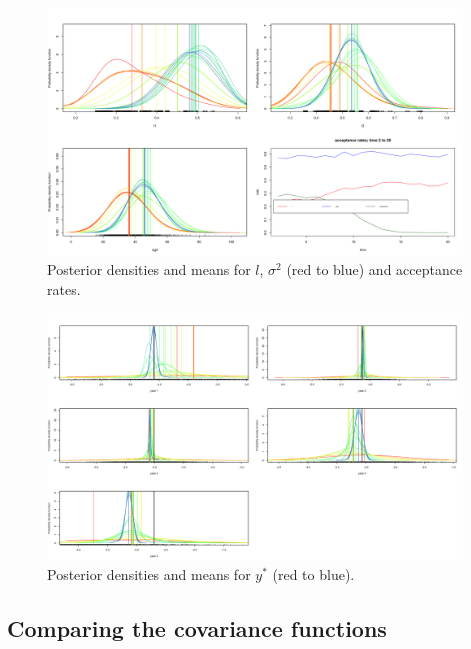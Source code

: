 \documentclass{sfuthesis}
\begin{document}
\begin{figure}[H]
  \begin{center}
    \includegraphics[width=0.98\textwidth]{ex2paras.png}
    \vspace{0.1mm}
    \caption{Posterior densities and means for $l$, $\sigma^2$ (red to blue) and acceptance rates.}
    \label{ex2paras}
  \end{center}
\end{figure}

\begin{figure}[H]
  \begin{center}
    \includegraphics[width=0.98\textwidth]{ex2ystar.png}
    \vspace{0.1mm}
    \caption{Posterior densities and means for $y^*$ (red to blue).}
    \label{ex2ystar}
  \end{center}
\end{figure}


\subsection{Comparing the covariance functions}
\end{document}
